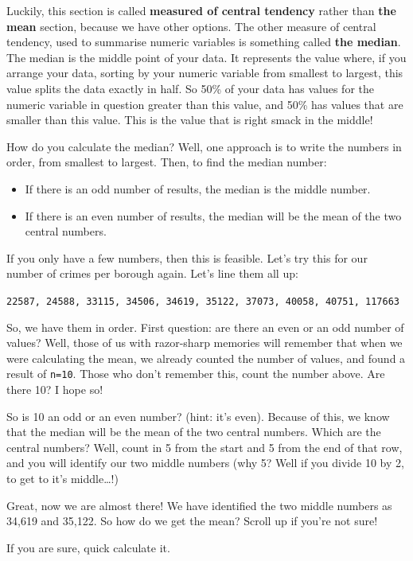 \documentclass[]{book}
\providecommand{\tightlist}{%
  \setlength{\itemsep}{0pt}\setlength{\parskip}{0pt}}
\theoremstyle{definition}
\theoremstyle{definition}
\theoremstyle{definition}
\theoremstyle{remark}
\begin{document}
Luckily, this section is called \textbf{measured of central tendency}
rather than \textbf{the mean} section, because we have other options.
The other measure of central tendency, used to summarise numeric
variables is something called \textbf{the median}. The median is the
middle point of your data. It represents the value where, if you arrange
your data, sorting by your numeric variable from smallest to largest,
this value splits the data exactly in half. So 50\% of your data has
values for the numeric variable in question greater than this value, and
50\% has values that are smaller than this value. This is the value that
is right smack in the middle!

How do you calculate the median? Well, one approach is to write the
numbers in order, from smallest to largest. Then, to find the median
number:

\begin{itemize}
\tightlist
\item
  If there is an odd number of results, the median is the middle number.
\item
  If there is an even number of results, the median will be the mean of
  the two central numbers.
\end{itemize}

If you only have a few numbers, then this is feasible. Let's try this
for our number of crimes per borough again. Let's line them all up:

\texttt{22587,\ 24588,\ 33115,\ 34506,\ 34619,\ 35122,\ 37073,\ 40058,\ 40751,\ 117663}

So, we have them in order. First question: are there an even or an odd
number of values? Well, those of us with razor-sharp memories will
remember that when we were calculating the mean, we already counted the
number of values, and found a result of \texttt{n=10}. Those who don't
remember this, count the number above. Are there 10? I hope so!

So is 10 an odd or an even number? (hint: it's even). Because of this,
we know that the median will be the mean of the two central numbers.
Which are the central numbers? Well, count in 5 from the start and 5
from the end of that row, and you will identify our two middle numbers
(why 5? Well if you divide 10 by 2, to get to it's middle\ldots{}!)

Great, now we are almost there! We have identified the two middle
numbers as 34,619 and 35,122. So how do we get the mean? Scroll up if
you're not sure!

If you are sure, quick calculate it.
\end{document}

